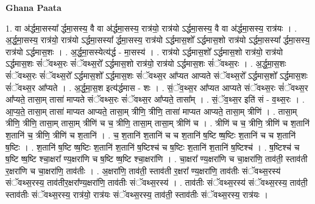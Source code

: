 \documentclass[17pt]{extarticle}
\begin{document}
\textbf{Ghana Paata } \newline

1. वा अ॑र्द्धमा॒सस्या᳚ र्द्धमा॒सस्य॒ वै वा अ॑र्द्धमा॒सस्य॒ रात्र॑यो॒ रात्र॑यो ऽर्द्धमा॒सस्य॒ वै वा अ॑र्द्धमा॒सस्य॒ रात्र॑यः । . अ॒र्द्ध॒मा॒सस्य॒ रात्र॑यो॒ रात्र॑यो ऽर्द्धमा॒सस्या᳚ र्द्धमा॒सस्य॒ रात्र॑यो ऽर्द्धमास॒शो᳚ ऽर्द्धमास॒शो रात्र॑यो ऽर्द्धमा॒सस्या᳚ र्द्धमा॒सस्य॒ रात्र॑यो ऽर्द्धमास॒शः । . अ॒र्द्ध॒मा॒सस्येत्य॑र्द्ध - मा॒सस्य॑ । . रात्र॑यो ऽर्द्धमास॒शो᳚ ऽर्द्धमास॒शो रात्र॑यो॒ रात्र॑यो ऽर्द्धमास॒शः सं॑ॅवथ्स॒रः सं॑ॅवथ्स॒रो᳚ ऽर्द्धमास॒शो रात्र॑यो॒ रात्र॑यो ऽर्द्धमास॒शः सं॑ॅवथ्स॒रः । . अ॒र्द्ध॒मा॒स॒शः सं॑ॅवथ्स॒रः सं॑ॅवथ्स॒रो᳚ ऽर्द्धमास॒शो᳚ ऽर्द्धमास॒शः सं॑ॅवथ्स॒र आ᳚प्यत आप्यते संॅवथ्स॒रो᳚ ऽर्द्धमास॒शो᳚ ऽर्द्धमास॒शः सं॑ॅवथ्स॒र आ᳚प्यते । . अ॒र्द्ध॒मा॒स॒श इत्य॑र्द्धमास - शः । . सं॒ॅव॒थ्स॒र आ᳚प्यत आप्यते संॅवथ्स॒रः सं॑ॅवथ्स॒र आ᳚प्यते॒ तासा॒म् तासा॑ माप्यते संॅवथ्स॒रः सं॑ॅवथ्स॒र आ᳚प्यते॒ तासा᳚म् । . सं॒ॅव॒थ्स॒र इति॑ सं - व॒थ्स॒रः । . आ॒प्य॒ते॒ तासा॒म् तासा॑ माप्यत आप्यते॒ तासा॒म् त्रीणि॒ त्रीणि॒ तासा॑ माप्यत आप्यते॒ तासा॒म् त्रीणि॑ । . तासा॒म् त्रीणि॒ त्रीणि॒ तासा॒म् तासा॒म् त्रीणि॑ च च॒ त्रीणि॒ तासा॒म् तासा॒म् त्रीणि॑ च । . त्रीणि॑ च च॒ त्रीणि॒ त्रीणि॑ च श॒तानि॑ श॒तानि॑ च॒ त्रीणि॒ त्रीणि॑ च श॒तानि॑ । . च॒ श॒तानि॑ श॒तानि॑ च च श॒तानि॑ ष॒ष्टि ष्ष॒ष्टिः श॒तानि॑ च च श॒तानि॑ ष॒ष्टिः । . श॒तानि॑ ष॒ष्टि ष्ष॒ष्टिः श॒तानि॑ श॒तानि॑ ष॒ष्टिश्च॑ च ष॒ष्टिः श॒तानि॑ श॒तानि॑ ष॒ष्टिश्च॑ । . ष॒ष्टिश्च॑ च ष॒ष्टि ष्ष॒ष्टि श्चा॒क्षरा᳚ ण्य॒क्षरा॑णि च ष॒ष्टि ष्ष॒ष्टि श्चा॒क्षरा॑णि । . चा॒क्षरा᳚ ण्य॒क्षरा॑णि च चा॒क्षरा॑णि॒ ताव॑ती॒ स्ताव॑ती र॒क्षरा॑णि च चा॒क्षरा॑णि॒ ताव॑तीः । . अ॒क्षरा॑णि॒ ताव॑ती॒ स्ताव॑ती र॒क्षरा᳚ ण्य॒क्षरा॑णि॒ ताव॑तीः संॅवथ्स॒रस्य॑ संॅवथ्स॒रस्य॒ ताव॑तीर॒क्षरा᳚ण्य॒क्षरा॑णि॒ ताव॑तीः संॅवथ्स॒रस्य॑ । . ताव॑तीः संॅवथ्स॒रस्य॑ संॅवथ्स॒रस्य॒ ताव॑ती॒ स्ताव॑तीः संॅवथ्स॒रस्य॒ रात्र॑यो॒ रात्र॑यः संॅवथ्स॒रस्य॒ ताव॑ती॒ स्ताव॑तीः संॅवथ्स॒रस्य॒ रात्र॑यः । \newline
\end{document}

